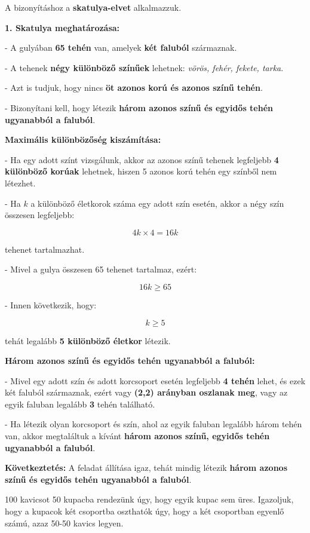 \begin{solution}
	A bizonyításhoz a \textbf{skatulya-elvet} alkalmazzuk.
	
	\textbf{1. Skatulya meghatározása:}
	
	- A gulyában \textbf{65 tehén} van, amelyek \textbf{két faluból} származnak.
	
	- A tehenek \textbf{négy különböző színűek} lehetnek: \textit{vörös,
		fehér, fekete, tarka}.
	
	- Azt is tudjuk, hogy nincs \textbf{öt azonos korú és azonos színű
		tehén}.
	
	- Bizonyítani kell, hogy létezik \textbf{három azonos színű és egyidős
		tehén ugyanabból a faluból}.
	
	\textbf{Maximális különbözőség kiszámítása:}
	
	- Ha egy adott színt vizsgálunk, akkor az azonos színű tehenek legfeljebb
	\textbf{4 különböző korúak} lehetnek, hiszen 5 azonos korú tehén egy
	színből nem létezhet.
	
	- Ha $k$ a különböző életkorok száma egy adott szín esetén, akkor
	a négy szín összesen legfeljebb:
	
	\[
	4k\times4=16k
	\]
	
	tehenet tartalmazhat.
	
	- Mivel a gulya összesen 65 tehenet tartalmaz, ezért:
	
	\[
	16k\geq65
	\]
	
	- Innen következik, hogy:
	
	\[
	k\geq5
	\]
	
	tehát legalább \textbf{5 különböző életkor} létezik.
	
	\textbf{Három azonos színű és egyidős tehén ugyanabból a faluból:}
	
	- Mivel egy adott szín és adott korcsoport esetén legfeljebb \textbf{4
		tehén} lehet, és ezek két faluból származnak, ezért vagy \textbf{(2,2)
		arányban oszlanak meg}, vagy az egyik faluban legalább \textbf{3}
	tehén található.
	
	- Ha létezik olyan korcsoport és szín, ahol az egyik faluban legalább
	három tehén van, akkor megtaláltuk a kívánt \textbf{három azonos színű,
		egyidős tehén ugyanabból a faluból}.
	
	\textbf{Következtetés:} A feladat állítása igaz, tehát mindig létezik
	\textbf{három azonos színű és egyidős tehén ugyanabból a faluból}.
\end{solution}
\begin{extraproblem}
	100 kavicsot 50 kupacba rendezünk úgy, hogy egyik kupac sem üres.
	Igazoljuk, hogy a kupacok két csoportba oszthatók úgy, hogy a két
	csoportban egyenlő számú, azaz 50-50 kavics legyen.
\end{extraproblem}


